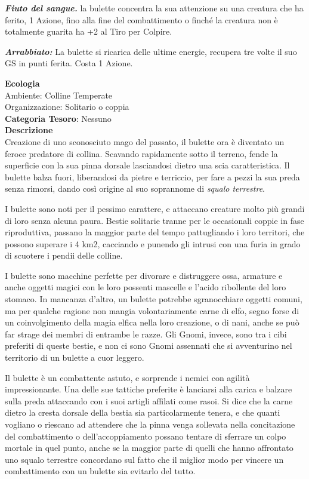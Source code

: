 \begin{multicols}{2}
{\emph{\textbf{Fiuto del sangue.}} la bulette concentra la sua attenzione su una creatura che ha ferito, 1 Azione, fino alla fine del combattimento o finché la creatura non è totalmente guarita ha +2 al Tiro per Colpire.

\emph{\textbf{Arrabbiato:}} La bulette si ricarica delle ultime energie, recupera tre volte il suo GS in punti ferita. Costa 1 Azione.

\textbf{Ecologia}\\
Ambiente: Colline Temperate\\
Organizzazione: Solitario o coppia\\
\textbf{Categoria Tesoro}: Nessuno\\
\textbf{Descrizione}\\
Creazione di uno sconosciuto mago del passato, il bulette ora è diventato un feroce predatore di collina. Scavando rapidamente sotto il terreno, fende la superficie con la sua pinna dorsale lasciandosi dietro una scia caratteristica. Il bulette balza fuori, liberandosi da pietre e terriccio, per fare a pezzi la sua preda senza rimorsi, dando così origine al suo soprannome di \emph{squalo terrestre}.

I bulette sono noti per il pessimo carattere, e attaccano creature molto più grandi di loro senza alcuna paura. Bestie solitarie tranne per le occasionali coppie in fase riproduttiva, passano la maggior parte del tempo pattugliando i loro territori, che possono superare i 4 km2, cacciando e punendo gli intrusi con una furia in grado di scuotere i pendii delle colline.

I bulette sono macchine perfette per divorare e distruggere ossa, armature e anche oggetti magici con le loro possenti mascelle e l'acido ribollente del loro stomaco. In mancanza d'altro, un bulette potrebbe sgranocchiare oggetti comuni, ma per qualche ragione non mangia volontariamente carne di elfo, segno forse di un coinvolgimento della magia elfica nella loro creazione, o di nani, anche se può far strage dei membri di entrambe le razze. Gli Gnomi, invece, sono tra i cibi preferiti di queste bestie, e non ci sono Gnomi assennati che si avventurino nel territorio di un bulette a cuor leggero.

Il bulette è un combattente astuto, e sorprende i nemici con agilità impressionante. Una delle sue tattiche preferite è lanciarsi alla carica e balzare sulla preda attaccando con i suoi artigli affilati come rasoi. Si dice che la carne dietro la cresta dorsale della bestia sia particolarmente tenera, e che quanti vogliano o riescano ad attendere che la pinna venga sollevata nella concitazione del combattimento o dell'accoppiamento possano tentare di sferrare un colpo mortale in quel punto, anche se la maggior parte di quelli che hanno affrontato uno squalo terrestre concordano sul fatto che il miglior modo per vincere un combattimento con un bulette sia evitarlo del tutto.

}
\end{multicols}
